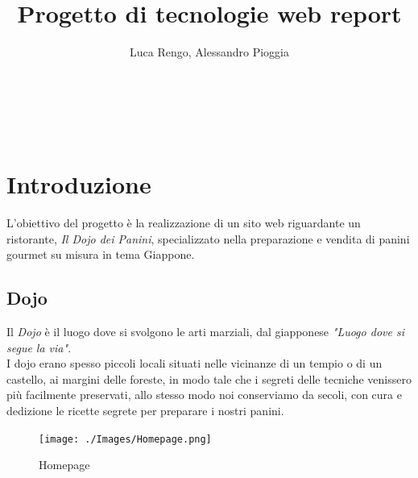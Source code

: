 \documentclass[a4paper,12pt]{report}
\title{\textbf{Progetto di tecnologie web report}}
\author{Luca Rengo, Alessandro Pioggia}
\begin{document}
	
	\makeatletter
	\begin{titlepage}
		\begin{center}
			{\Huge  \@title }\\[3ex] 
			{\large  \@author}\\[3ex] 
			{\large \@date}
		\end{center}
	\end{titlepage}
	\makeatother
	\thispagestyle{empty}
	\newpage
	
	
	\tableofcontents

	\newpage
	
	
	\section{Introduzione}
	\textsf{\small L'obiettivo del progetto è la realizzazione di un sito web riguardante un ristorante, \emph{Il Dojo dei Panini}, specializzato nella preparazione e vendita di panini gourmet su misura in tema Giappone.}
	\subsection{Dojo}
	\textsf{\small Il \emph{Dojo} è il luogo dove si svolgono le arti marziali, dal giapponese \emph{"Luogo dove si segue la via"}.}\\
	\textsf{\small I dojo erano spesso piccoli locali situati nelle vicinanze di un tempio o di un castello, ai margini delle foreste, in modo tale che i segreti delle tecniche venissero più facilmente preservati, allo stesso modo noi conserviamo da secoli, con cura e dedizione le ricette segrete per preparare i nostri panini.}\\
	
	\begin{figure}[ht] 
		\centering
		\texttt{[image: ./Images/Homepage.png]}
		\caption{Homepage}
		\label{fig:homepage}
	\end{figure}

	
	\newpage
	
	
\end{document}
